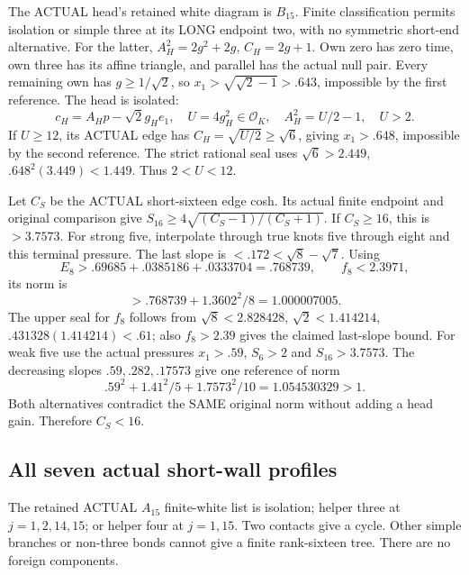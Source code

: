 The ACTUAL head's retained white diagram is \(B_{15}\).
Finite classification permits isolation or simple
three at its LONG endpoint two, with no symmetric
short-end alternative.
For the latter,
\(A_H^2=2g^2+2g\), \(C_H=2g+1\).
Own zero has zero time, own three has its affine
triangle, and parallel has the actual null pair.
Every remaining own has \(g\ge1/\sqrt2\), so
\(x_1>\sqrt{\sqrt2-1}>.643\), impossible by the
first reference.
The head is isolated:
\[
 c_H=A_Hp-\sqrt2g_He_1,\quad
 U=4g_H^2\in\mathcal O_K,\quad A_H^2=U/2-1,\quad U>2 .
\]
If \(U\ge12\), its ACTUAL edge has
\(C_H=\sqrt{U/2}\ge\sqrt6\), giving \(x_1>.648\),
impossible by the second reference.
The strict rational seal uses
\(\sqrt6>2.449\),
\(.648^2(3.449)<1.449\).
Thus \(2<U<12\).

Let \(C_S\) be the ACTUAL short-sixteen edge cosh.
Its actual finite endpoint and original comparison give
\(S_{16}\ge4\sqrt{(C_S-1)/(C_S+1)}\).
If \(C_S\ge16\), this is \(>3.7573\).
For strong five, interpolate through true knots
five through eight and this terminal pressure.
The last slope is \(<.172<\sqrt8-\sqrt7\).
Using
\[
 E_8>.69685+.0385186+.0333704=.768739,\qquad f_8<2.3971,
\]
its norm is
\[
                      >.768739+1.3602^2/8=1.000007005 .
\]
The upper seal for \(f_8\) follows from
\(\sqrt8<2.828428\), \(\sqrt2<1.414214\),
\(.431328(1.414214)<.61\); also \(f_8>2.39\)
gives the claimed last-slope bound.
For weak five use the actual pressures
\(x_1>.59\), \(S_6>2\) and \(S_{16}>3.7573\).
The decreasing slopes \(.59,.282,.17573\) give
one reference of norm
\[
                     .59^2+1.41^2/5+1.7573^2/10
                            =1.054530329>1 .
\]
Both alternatives contradict the SAME original
norm without adding a head gain.
Therefore \(C_S<16\).

\subsection{All seven actual short-wall profiles}
\label{app:arithB16shortwhite}

The retained ACTUAL \(A_{15}\) finite-white list is
isolation; helper three at \(j=1,2,14,15\);
or helper four at \(j=1,15\).
Two contacts give a cycle.
Other simple branches or non-three bonds cannot
give a finite rank-sixteen tree.
There are no foreign components.

